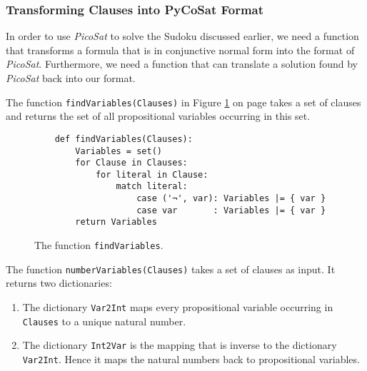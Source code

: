 \pagebreak
\subsubsection{Transforming Clauses into PyCoSat Format}
In order to use \textsl{PicoSat} to solve the Sudoku discussed earlier, we need a function that transforms a
formula that is in conjunctive normal form into the format of \textsl{PicoSat}.  Furthermore, we need  a function that can translate a solution found by \textsl{PicoSat} back into our format.

The function \texttt{findVariables(Clauses)} in Figure \ref{fig:sudoku-findVariables} on page
\pageref{fig:sudoku-findVariables} takes a set of clauses and returns the set of all propositional variables
occurring in this set.


\begin{figure}[!ht]
\centering
\begin{verbatim}
    def findVariables(Clauses):
        Variables = set()
        for Clause in Clauses:
            for literal in Clause:
                match literal:
                    case ('¬', var): Variables |= { var }
                    case var       : Variables |= { var }
        return Variables
\end{verbatim}
\vspace*{-0.3cm}
\caption{The function \texttt{findVariables}.}
\label{fig:sudoku-findVariables}
\end{figure}

The function \texttt{numberVariables(Clauses)} takes a set of clauses as input.  It returns two dictionaries:
\begin{enumerate}
\item The dictionary \texttt{Var2Int} maps every propositional variable occurring in \texttt{Clauses} to a
      unique natural number. 
\item The dictionary \texttt{Int2Var} is the mapping that is inverse to the dictionary \texttt{Var2Int}.
      Hence it maps the natural numbers back to propositional variables.
\end{enumerate}

